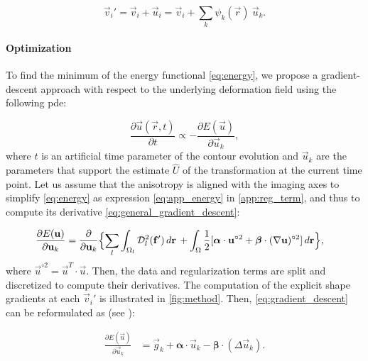   \begin{equation}
  \vec{v}_i' = \vec{v}_i + \vec{u}_i = \vec{v}_i + \sum_k \psi_k(\vec{r}) \: \vec{u}_k.
  \label{eq:nodes_tfm}
  \end{equation}


\paragraph*{Optimization}
\label{sec:gradient_descent}
To find the minimum of the energy functional \eqref{eq:energy},
  we propose a gradient-descent approach with respect to the underlying
  deformation field using the following \gls*{pde}:

  \begin{equation}
  \frac{\partial \vec{u}(\vec{r},t)}{\partial t} \propto - \frac{\partial E(\vec{u})}{\partial \vec{u}_k},
  \label{eq:general_gradient_descent}
  \end{equation}
  where $t$ is an artificial time parameter of the contour
  evolution and $\vec{u}_k$ are the parameters that support the estimate
  $\hat{U}$ of the transformation at the current time point.
Let us assume that the anisotropy is aligned with the imaging axes to simplify
  \eqref{eq:energy} as expression \eqref{eq:app_energy} in \ref{app:reg_term},
  and thus to compute its derivative \eqref{eq:general_gradient_descent}:

  \begin{align}
  \frac{\partial E(\vec{u})}{\partial \vec{u}_k} &=
  \frac{ \partial }{\partial \vec{u}_k} \Big\{
  \underset{l}{\sum} \int_{\Omega_l} \mdist{f'}{l} \,d\vec{r} \, +   \int_{\Omega} \frac12 [ \boldsymbol{\alpha} \cdot \vec{u}^{\circ2}
  + \boldsymbol{\beta} \cdot (\nabla \vec{u})^{\circ2} ] \,d\vec{r}
  \Big\},
  \label{eq:gradient_descent}
  \end{align}
  where $\vec{u}^{\circ2} = \vec{u}^T \cdot \vec{u}$.
Then, the data and regularization terms are split and discretized to compute their
  derivatives.
The computation of the explicit shape gradients at each $\vec{v}_i'$ is illustrated in \autoref{fig:method}.
Then, \eqref{eq:gradient_descent} can be reformulated as (see ):

  \begin{align}
  \frac{\partial E(\vec{u})}{\partial \vec{u}_k} &=
  \vec{g}_k  + \boldsymbol{\alpha} \cdot \vec{u}_k - \boldsymbol{\beta} \cdot (\Delta \vec{u}_k).
  \label{eq:final_gradient}
  \end{align}

